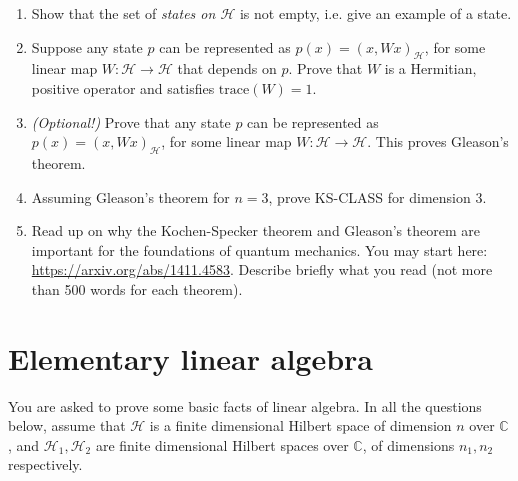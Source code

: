 \documentclass[10pt]{article}
\newcounter{ex}
\theoremstyle{plain}
\theoremstyle{definition}
\begin{document}
\begin{enumerate}[label=(\alph*),start=3]
\item Show that the set of \textit{states on $\mathcal{H}$} is not empty, i.e. give an example of a state.

\item Suppose any state $p$ can be represented as $p(x) = (x, Wx)_{\mathcal{H}}$, for some linear map $W : \mathcal{H} \rightarrow \mathcal{H}$ that depends on $p$. Prove that $W$ is a Hermitian, positive operator and satisfies $\text{trace}(W) = 1$.

\item \textit{(Optional!)} Prove that any state $p$ can be represented as $p(x) = (x, Wx)_{\mathcal{H}}$, for some linear map $W : \mathcal{H} \rightarrow \mathcal{H}$. This proves Gleason's theorem.

\item Assuming Gleason's theorem for $n = 3$, prove KS-CLASS for dimension $3$.

\item Read up on why the Kochen-Specker theorem and Gleason's theorem are important for the foundations of quantum mechanics. You may start here: \url{https://arxiv.org/abs/1411.4583}. Describe briefly what you read (not more than 500 words for each theorem).
\end{enumerate}

\section{Elementary linear algebra}
You are asked to prove some basic facts of linear algebra. In all the questions below, assume that $\mathcal{H}$ is a finite dimensional Hilbert space of dimension $n$ over $\mathbb{C}$, and $\mathcal{H}_1, \mathcal{H}_2$ are finite dimensional Hilbert spaces over $\mathbb{C}$, of dimensions $n_1, n_2$ respectively.
\end{document}
